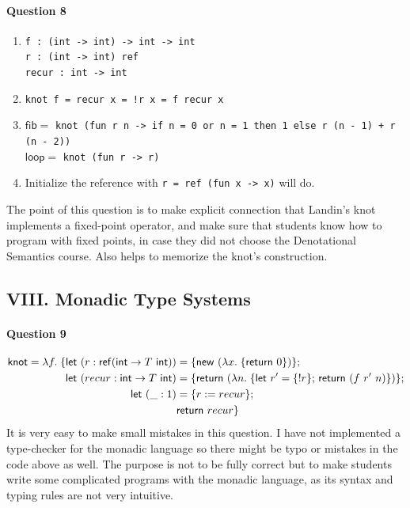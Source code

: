 \documentclass[11pt,a4paper,twoside]{article}
\begin{document}
\paragraph*{Question 8}
\begin{enumerate}[label=(\alph*)]
  \item \lstinline|f : (int -> int) -> int -> int|\\
    \lstinline|r : (int -> int) ref|\\
    \lstinline|recur : int -> int|
  \item \lstinline|knot f = recur x = !r x = f recur x|
  \item $\mathsf{fib} = $ \lstinline|knot (fun r n -> if n = 0 or n = 1 then 1 else r (n - 1) + r (n - 2))|\\
    $\mathsf{loop} = $ \lstinline|knot (fun r -> r)|
  \item Initialize the reference with \lstinline|r = ref (fun x -> x)| will do.
\end{enumerate}
%
The point of this question is to make explicit connection that Landin's knot
implements a fixed-point operator, and make sure that students know how to program
with fixed points, in case they did not choose the Denotational Semantics course.
Also helps to memorize the knot's construction.

\subsection*{VIII. Monadic Type Systems}

\paragraph*{Question 9}

\begin{align*}
  \mathsf{knot} = \ulam{f}{ \{
    \mathsf{let}\ (r : \mathsf{ref}(\mathsf{int} \to T\ \mathsf{int}))  &= \{\mathsf{new}\ (\ulam{x}{\{\mathsf{return}\ 0\}})\}; \\
    \mathsf{let}\ (recur : \mathsf{int} \to T\ \mathsf{int}) &= \{ \mathsf{return}\ (\ulam{n}{
      \{ \letseq{r'}{\{ !r \}}{\mathsf{return}\ (f\ r'\ n)}\}}) \}; \\
    \mathsf{let}\ (\_ : 1) &= \{ r := recur \}; \\
    & \mathsf{return}\ recur \}
  }
\end{align*}
%
It is very easy to make small mistakes in this question. 
I have not implemented a type-checker for the monadic language so there might be
typo or mistakes in the code above as well.
The purpose is not to be fully correct but to make students write some complicated programs with the monadic language,
as its syntax and typing rules are not very intuitive.
\end{document}
